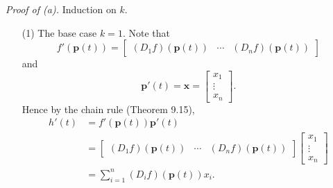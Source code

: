 \documentclass{article}
\begin{document}
\emph{Proof of (a).}
Induction on $k$.
\begin{enumerate}
\item[(1)]
  The base case $k = 1$.
  Note that
  \[
    f'(\mathbf{p}(t))
    =
    \begin{bmatrix}
      (D_1 f)(\mathbf{p}(t)) & \cdots & (D_n f)(\mathbf{p}(t))
    \end{bmatrix}
  \]
  and
  \[
    \mathbf{p}'(t)
    = \mathbf{x}
    =
    \begin{bmatrix}
      x_1 \\
      \vdots \\
      x_n
    \end{bmatrix}.
  \]
  Hence by the chain rule (Theorem 9.15),
  \begin{align*}
    h'(t)
    &= f'(\mathbf{p}(t)) \mathbf{p}'(t) \\
    &= \begin{bmatrix}
      (D_1 f)(\mathbf{p}(t)) & \cdots & (D_n f)(\mathbf{p}(t))
    \end{bmatrix}
    \begin{bmatrix}
      x_1 \\
      \vdots \\
      x_n
    \end{bmatrix} \\
    &= \sum_{i=1}^{n} (D_i f)(\mathbf{p}(t))x_i.
  \end{align*}


\end{enumerate}
\end{document}
